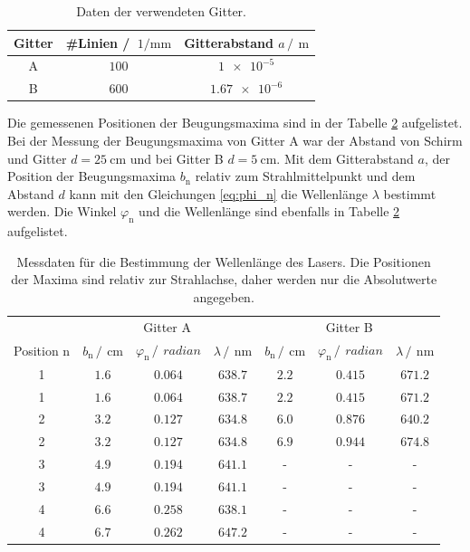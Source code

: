 \FloatBarrier
\begin{table}
  \centering
  \caption{Daten der verwendeten Gitter.}
  \label{tab:Gitterabstand}
  \begin{tabular}{c c c}
    \toprule
    Gitter&\#Linien / $\SI{}{1\per\milli\meter}$&Gitterabstand $a\,/\,\SI{}{\meter}$\\
    \midrule
    A&$\num{100}$&$\num{1e-5}$\\
    B&$\num{600}$&$\num{1.67e-6}$\\
    \bottomrule
  \end{tabular}
\end{table}
\FloatBarrier

Die gemessenen Positionen der Beugungsmaxima sind in der Tabelle \ref{tab:Maxposi} aufgelistet. Bei der Messung der 
Beugungsmaxima von Gitter A war der Abstand von Schirm und Gitter $d=\SI{25}{\centi\meter}$ und bei Gitter B $d=\SI{5}{\centi\meter}$.
Mit dem Gitterabstand $a$, der Position der Beugungsmaxima $b_{\text{n}}$ relativ zum Strahlmittelpunkt und dem Abstand $d$ kann mit den
Gleichungen \eqref{eq:phi_n}
die Wellenlänge $\lambda$ bestimmt werden. Die Winkel $\varphi_{\text{n}}$ und die Wellenlänge sind ebenfalls in Tabelle \ref{tab:Maxposi} aufgelistet.

\FloatBarrier
\begin{table}
  \centering
  \caption{Messdaten für die Bestimmung der Wellenlänge des Lasers. Die Positionen der Maxima sind relativ zur Strahlachse, daher werden nur die Absolutwerte angegeben.}
  \label{tab:Maxposi}
  \begin{tabular}{c c c c| c c c}
    \toprule
    &\multicolumn{3}{c}{Gitter A}&\multicolumn{3}{c}{Gitter B}\\
    \cmidrule(lr){2-4} \cmidrule(lr){5-7}
    Position n&$b_{\text{n}}\,/\,\SI{}{\centi\meter}$&$\varphi_{\text{n}}\,/\,\SI{}{radian}$&$\lambda\,/\,\SI{}{\nano\meter}$&$b_{\text{n}}\,/\,\SI{}{\centi\meter}$&$\varphi_{\text{n}}\,/\,\SI{}{radian}$&$\lambda\,/\,\SI{}{\nano\meter}$\\
    \midrule
    1&$\num{1.6}$&$\num{0.064}$&$\num{638.7}$&$\num{2.2}$&$\num{0.415}$&$\num{671.2}$\\
    1&$\num{1.6}$&$\num{0.064}$&$\num{638.7}$&$\num{2.2}$&$\num{0.415}$&$\num{671.2}$\\
    2&$\num{3.2}$&$\num{0.127}$&$\num{634.8}$&$\num{6.0}$&$\num{0.876}$&$\num{640.2}$\\
    2&$\num{3.2}$&$\num{0.127}$&$\num{634.8}$&$\num{6.9}$&$\num{0.944}$&$\num{674.8}$\\
    3&$\num{4.9}$&$\num{0.194}$&$\num{641.1}$&-&-&-\\
    3&$\num{4.9}$&$\num{0.194}$&$\num{641.1}$&-&-&-\\
    4&$\num{6.6}$&$\num{0.258}$&$\num{638.1}$&-&-&-\\
    4&$\num{6.7}$&$\num{0.262}$&$\num{647.2}$&-&-&-\\
    \bottomrule
  \end{tabular}
\end{table}
\FloatBarrier 

